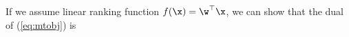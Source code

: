 If we assume linear ranking function $f(\x) = \w^\top \x$, we can show that the dual of (\ref{eq:mtobj}) is
\begin{equation}
\label{eq:mtdual}
\begin{aligned}
\end{aligned}
\end{equation}




